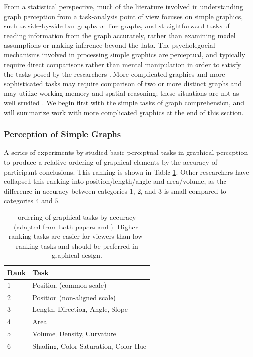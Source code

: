 \documentclass[11pt]{isuthesis}\usepackage[]{graphicx}\usepackage[]{color}
\begin{document}
From a statistical perspective, much of the literature involved in understanding graph perception from a task-analysis point of view focuses on simple graphics, such as side-by-side bar graphs or line graphs, and straightforward tasks of reading information from the graph accurately, rather than examining model assumptions or making inference beyond the data. The psychologocial mechanisms involved in processing simple graphics are perceptual, and typically require direct comparisons rather than mental manipulation in order to satisfy the tasks posed by the researchers \citep{trickett2006toward}. More complicated graphics and more sophisticated tasks may require comparison of two or more distinct graphs and may utilize working memory and spatial reasoning; these situations are not as well studied \citep{shah2005cambridge}. We begin first with the simple tasks of graph comprehension, and will summarize work with more complicated graphics at the end of this section. 

\subsubsection{Perception of Simple Graphs}
A series of experiments by \citet{cleveland:1984, cleveland:1985} studied basic perceptual tasks in graphical perception to produce a relative ordering of graphical elements by the accuracy of participant conclusions. This ranking is shown in Table \ref{clevelandranking}. Other researchers \citep{kosslyn1994} have collapsed this ranking into position/length/angle and area/volume, as the difference in accuracy between categories 1, 2, and 3 is small compared to categories 4 and 5. 
\begin{table}[htbp]\centering
\begin{tabular}{ll}
\hline
Rank & Task\\\hline
1 & Position (common scale)\\
2 & Position (non-aligned scale)\\
3 & Length, Direction, Angle, Slope\\
4 & Area \\
5 & Volume, Density, Curvature\\
6 & Shading, Color Saturation, Color Hue\\\hline
\end{tabular}
\caption[Cleveland \& McGill's ordering of graphical tasks]{\protect\citet{cleveland:1984, cleveland:1985} ordering of graphical tasks by accuracy (adapted from both papers and \protect\citealt{shah2005cambridge}). Higher-ranking tasks are easier for viewers than low-ranking tasks and should be preferred in graphical design.}\label{clevelandranking}
\end{table}
\end{document}
